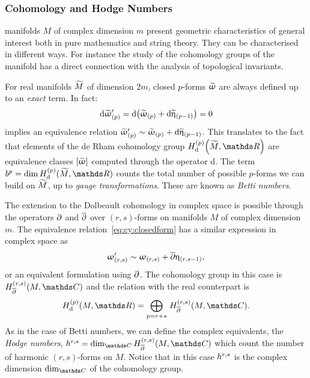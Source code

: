 \subsubsection{Cohomology and Hodge Numbers}
\label{sec:cohomology_hodge}

\cy manifolds $M$ of complex dimension $m$ present geometric characteristics of general interest both in pure mathematics and string theory.
They can be characterised in different ways.
For instance the study of the cohomology groups of the manifold has a direct connection with the analysis of topological invariants.

For real manifolds $\widetilde{M}$ of dimension $2m$, closed $p$-forms $\widetilde{\upomega}$ are always defined up to an \emph{exact} term.
In fact:
\begin{equation}
  \dd{\tomega'_{(p)}} = \dd{\qty(\tomega_{(p)} + \dd{\teta_{(p-1)}})} = 0
  \label{eq:cy:closedform}
\end{equation}
implies an equivalence relation $\tomega'_{(p)} \sim \tomega_{(p)} + \dd{\teta_{(p-1)}}$.
This translates to the fact that elements of the de Rham cohomology group $H^{(p)}_{\mathrm{d}}\qty(\tildeM, \R)$ are equivalence classes $[ \widetilde{\upomega} ]$ computed through the operator $\mathrm{d}$.
The term $b^{p} = \dim{H^{(p)}_{\mathrm{d}}( \tildeM, \R )}$ counts the total number of possible $p$-forms we can build on $\widetilde{M}$, up to \emph{gauge transformations}.
These are known as \emph{Betti numbers}.

The extension to the Dolbeault cohomology in complex space is possible through the operators $\partial$ and $\overline{\partial}$ over $(r, s)$-forms on manifolds $M$ of complex dimension $m$.
The equivalence relation~\eqref{eq:cy:closedform} has a similar expression in complex space as
\begin{equation}
  \upomega'_{(r,s)} \sim \upomega_{(r,s)} + \overline{\partial} \upeta_{(r,s-1)},
\end{equation}
or an equivalent formulation using $\partial$.
The cohomology group in this case is $H^{(r,s)}_{\bpd}( M, \C )$ and the relation with the real counterpart is
\begin{equation}
  H^{(p)}_{\mathrm{d}}( M, \R )
  =
  \bigoplus\limits_{p = r + s}\,
  H^{(r,s)}_{\bpd}( M, \C ).
\end{equation}
As in the case of Betti numbers, we can define the complex equivalents, the \emph{Hodge numbers}, $\hodge{r}{s} = \dim\limits_{\C} H^{(r,s)}_{\bpd}( M, \C )$ which count the number of harmonic $(r, s)$-forms on $M$.
Notice that in this case $h^{r,s}$ is the complex dimension $\dim\limits_{\C}$ of the cohomology group.


